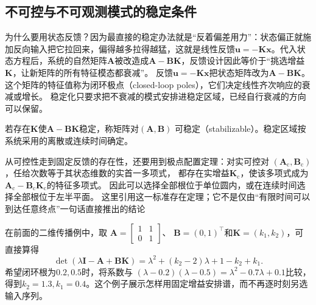 \subsection{不可控与不可观测模式的稳定条件}
为什么要用状态反馈？因为最直接的稳定办法就是“反着偏差用力”：状态偏正就施加反向输入把它拉回来，偏得越多拉得越猛，这就是线性反馈\(\bm u=-\bm K\bm x\)。代入状态方程后，系统的自然矩阵\(\bm A\)被改造成\(\bm A-\bm{BK}\)，反馈设计因此等价于“挑选增益\(\bm K\)，让新矩阵的所有特征模态都衰减”。
反馈$\bm u=-\bm K\bm x$把状态矩阵改为$\bm A-\bm B\bm K$。
这个矩阵的特征值称为闭环极点（closed-loop poles），它们决定线性齐次响应的衰减或增长。
稳定化只要求把不衰减的模式安排进稳定区域，已经自行衰减的方向可以保留。
\begin{definition}[可稳定性]
\label{def:control-stabilizability}
若存在$\bm K$使$\bm A-\bm B\bm K$稳定，称矩阵对$(\bm A,\bm B)$
可稳定（stabilizable）。稳定区域按系统采用的离散或连续时间确定。
\end{definition}

从可控性走到固定反馈的存在性，还要用到极点配置定理：对实可控对
$(\bm A_{\mathrm c},\bm B_{\mathrm c})$，任给次数等于其状态维数的实首一多项式，
都存在实增益$\bm K_{\mathrm c}$，使该多项式成为
$\bm A_{\mathrm c}-\bm B_{\mathrm c}\bm K_{\mathrm c}$的特征多项式。
因此可以选择全部根位于单位圆内，或在连续时间选择全部根位于左半平面。
这里引用这一标准存在定理；它不是仅由“有限时间可以到达任意终点”一句话直接推出的结论

在前面的二维传播例中，取
$\bm A=\left[\begin{smallmatrix}1&1\\0&1\end{smallmatrix}\right]$、
$\bm B=(0,1)^\top$和$\bm K=(k_1,k_2)$，可直接算得
\[
 \det(\lambda\bm I-\bm A+\bm B\bm K)
 =\lambda^2+(k_2-2)\lambda+1-k_2+k_1.
\]
希望闭环根为$0.2,0.5$时，将系数与
$(\lambda-0.2)(\lambda-0.5)=\lambda^2-0.7\lambda+0.1$比较，
得到$k_2=1.3,k_1=0.4$。这个例子展示怎样用固定增益安排谱，而不再逐时刻另选输入序列。

